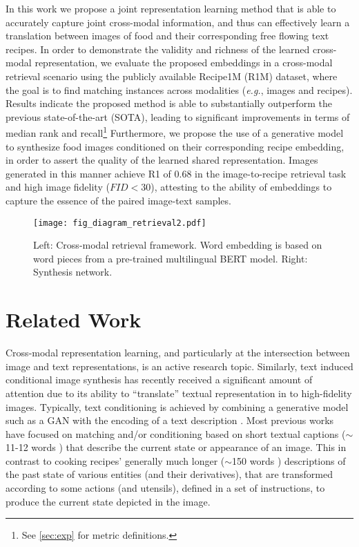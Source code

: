 \documentclass[sigconf,nonacm]{acmart}
\def\eg{\emph{e.g.}} \def\Eg{\emph{E.g.}}
\begin{document}
In this work we propose a joint representation learning method that is able to accurately capture joint cross-modal information, and thus can effectively learn a translation between images of food and their corresponding free flowing text recipes. In order to demonstrate the validity and richness of the learned cross-modal representation, we evaluate the proposed embeddings in a cross-modal retrieval scenario using the publicly available Recipe1M (R1M) dataset, where the goal is to find matching instances across modalities (\eg, images and recipes). Results indicate the proposed method is able to substantially outperform the previous state-of-the-art (SOTA), leading to significant improvements in terms of median rank and recall\footnote{See \autoref{sec:exp} for metric definitions.} Furthermore, we propose the use of a generative model to synthesize food images conditioned on their corresponding recipe embedding, in order to assert the quality of the learned shared representation. Images generated in this manner 
achieve R1 of 0.68 in the image-to-recipe retrieval task 
and
high image fidelity ($FID < 30$), attesting to the ability of embeddings to capture the essence of the paired image-text samples. 

\begin{figure*}[!ht]
\begin{center}
\texttt{[image: fig\_diagram\_retrieval2.pdf]}
\end{center}
\caption{Left: Cross-modal retrieval framework. Word embedding is based on word pieces from a pre-trained multilingual BERT model. Right: Synthesis network. 
}
\label{fig:diagram}
\vspace{-1em}
\end{figure*}

\section{Related Work}
Cross-modal representation learning, and particularly at the intersection between image and text representations, is an active research topic\cite{lee18,gu18,huang19}. Similarly, text induced conditional image synthesis has recently received a significant amount of attention due to its ability to ``translate'' textual representation in to high-fidelity images. Typically, text conditioning is achieved by combining a generative model such as a GAN with the encoding of a text description \cite{reed16,han2017stackgan,Xu_2018_CVPR,Zhu_2019_CVPR}. Most previous works have focused on matching and/or conditioning based on short textual captions ($\sim$11-12 words \cite{coco,flicker30k}) that describe the current state or appearance of an image. This in contrast to cooking recipes' generally much longer ($\sim$150 words \cite{salvador2017,marin2019}) descriptions of the past state of various entities (and their derivatives), that are transformed according to some actions (and utensils), defined in a set of instructions, to produce the current state depicted in the image. 
\end{document}
